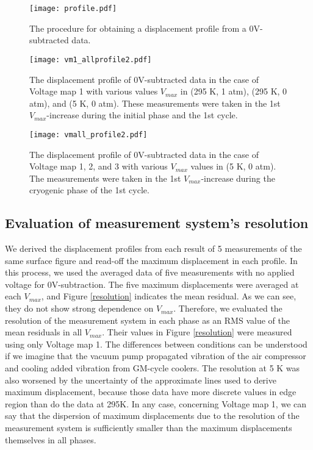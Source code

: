 \documentclass[a4paper]{article}
\begin{document}
\begin{figure}[htbp]
\centering
\texttt{[image: profile.pdf]}
\caption{The procedure for obtaining a displacement profile from a 0V-subtracted data.}
\label{profile}
\end{figure}

\begin{figure}[htbp]
\centering
\texttt{[image: vm1\_allprofile2.pdf]}
\caption{The displacement profile of 0V-subtracted data in the case of Voltage map 1 with various values $V_{max}$ in (295 K, 1 atm), (295 K, 0 atm), and (5 K, 0 atm). These measurements were taken in the 1st $V_{max}$-increase during the initial phase and the 1st cycle.}
\label{vm1_profile}
\end{figure}

\begin{figure}[htbp]
\centering
\texttt{[image: vmall\_profile2.pdf]}
\caption{The displacement profile of 0V-subtracted data in the case of Voltage map 1, 2, and 3 with various $V_{max}$ values in (5 K, 0 atm). The measurements were taken in the 1st $V_{max}$-increase during the cryogenic phase of the 1st cycle.}
\label{5K_0atm_profile}
\end{figure}

\subsection{Evaluation of measurement system's resolution}
\label{resolution_estimate}
We derived the displacement profiles from each result of 5 measurements of the same surface figure and read-off the maximum displacement in each profile. In this process, we used the averaged data of five measurements with no applied voltage for 0V-subtraction. The five maximum displacements were averaged at each $V_{max}$, and Figure \ref{resolution} indicates the mean residual. As we can see, they do not show strong dependence on $V_{max}$. Therefore, we evaluated the resolution of the measurement system in each phase as an RMS value of the mean residuals in all $V_{max}$. Their values in Figure \ref{resolution} were measured using only Voltage map 1. The differences between conditions can be understood if we imagine that the vacuum pump propagated vibration of the air compressor and cooling added vibration from GM-cycle coolers. The resolution at 5 K was also worsened by the uncertainty of the approximate lines used to derive maximum displacement, because those data have more discrete values in edge region than do the data at 295K. In any case, concerning Voltage map 1, we can say that the dispersion of maximum displacements due to the resolution of the measurement system is sufficiently smaller than the maximum displacements themselves in all phases.
\end{document}
